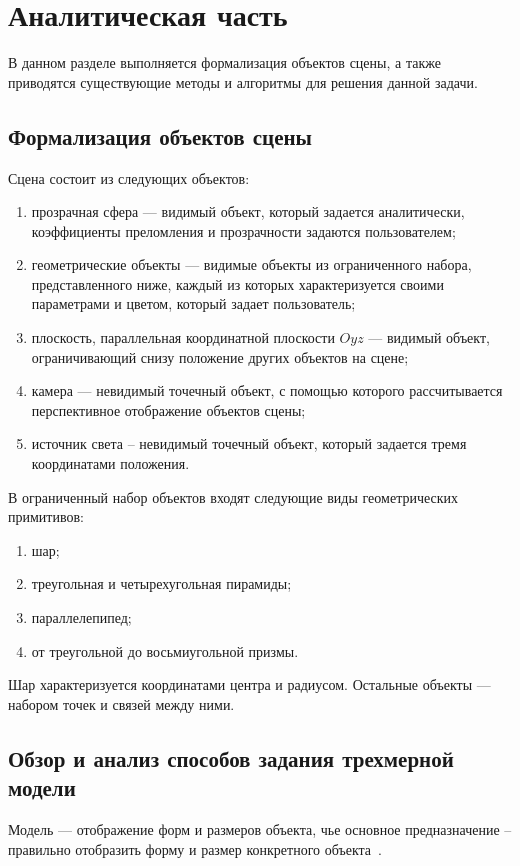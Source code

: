 \section{Аналитическая часть}
В данном разделе выполняется формализация объектов сцены, а также приводятся существующие методы и алгоритмы для решения данной задачи.

\subsection{Формализация объектов сцены}
Сцена состоит из следующих объектов:
\begin{enumerate}
	\item прозрачная сфера --- видимый объект, который задается аналитически, коэффициенты преломления и прозрачности задаются пользователем;
	\item геометрические объекты --- видимые объекты из ограниченного набора, представленного ниже, каждый из которых характеризуется своими параметрами и цветом, который задает пользователь;
	\item плоскость, параллельная координатной плоскости $Oyz$ --- видимый объект, ограничивающий снизу положение других объектов на сцене;
	\item камера --- невидимый точечный объект, с помощью которого рассчитывается перспективное отображение объектов сцены;
	\item источник света -- невидимый точечный объект, который задается тремя координатами положения.
\end{enumerate}

В ограниченный набор объектов входят следующие виды геометрических примитивов:
\begin{enumerate}
	\item шар;
	\item треугольная и четырехугольная пирамиды;
	\item параллелепипед;
	\item от треугольной до восьмиугольной призмы.
\end{enumerate}

Шар характеризуется координатами центра и радиусом. Остальные объекты --- набором точек и связей между ними.


\subsection{Обзор и анализ способов задания трехмерной модели}
Модель --- отображение форм и размеров объекта, чье основное предназначение -- правильно отобразить форму и размер конкретного объекта~\cite{Kurov}. 

